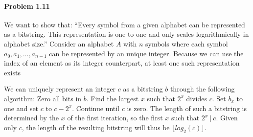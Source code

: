 \documentclass{article}
\begin{document}
\paragraph{Problem 1.11} We want to show that: \enquote{Every symbol from a given alphabet can be represented as a bitstring. This representation is one-to-one and only scales logarithmically in alphabet size.} Consider an alphabet $A$ with $n$ symbols where each symbol $a_0, a_1, \ldots, a_{n - 1}$ can be represented by an unique integer. Because we can use the index of an element as its integer counterpart, at least one such representation exists

We can uniquely represent an integer $c$ as a bitstring $b$ through the following algorithm: Zero all bits in $b$. Find the largest $x$ such that $2^x$ divides $c$. Set $b_x$ to one and set $c$ to $c - 2^x$. Continue until $c$ is zero. The length of such a bitstring is determined by the $x$ of the first iteration, so the first $x$ such that $2^x\ |\ c$. Given only $c$, the length of the resulting bitstring will thus be $\lfloor log_2(c) \rfloor$.
\end{document}
